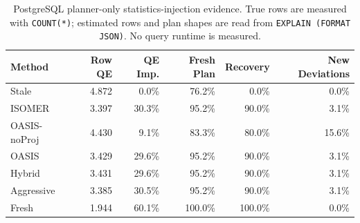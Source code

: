 \begin{table}[t]
  \centering
  \small
  \caption{PostgreSQL planner-only statistics-injection evidence. True rows are measured with \texttt{COUNT(*)}; estimated rows and plan shapes are read from \texttt{EXPLAIN (FORMAT JSON)}. No query runtime is measured.}
  \label{tab:postgres_planner_stats_injection}
  \setlength{\tabcolsep}{4pt}
  \begin{tabular}{lrrrrr}
    \toprule
    Method & Row QE & QE Imp. & Fresh Plan & Recovery & New Deviations \\
    \midrule
    Stale & 4.872 & 0.0\% & 76.2\% & 0.0\% & 0.0\% \\
    ISOMER & 3.397 & 30.3\% & 95.2\% & 90.0\% & 3.1\% \\
    OASIS-noProj & 4.430 & 9.1\% & 83.3\% & 80.0\% & 15.6\% \\
    OASIS & 3.429 & 29.6\% & 95.2\% & 90.0\% & 3.1\% \\
    Hybrid & 3.431 & 29.6\% & 95.2\% & 90.0\% & 3.1\% \\
    Aggressive & 3.385 & 30.5\% & 95.2\% & 90.0\% & 3.1\% \\
    Fresh & 1.944 & 60.1\% & 100.0\% & 100.0\% & 0.0\% \\
    \bottomrule
  \end{tabular}
\end{table}
